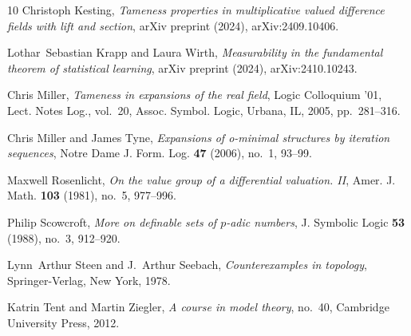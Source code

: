 \documentclass[11pt]{amsart}
\theoremstyle{plain}
\theoremstyle{definition}
\numberwithin{equation}{section}
\newcommand\0{\varnothing}
\begin{document}
\begin{thebibliography}{10}
Christoph Kesting, \emph{Tameness properties in multiplicative valued
  difference fields with lift and section}, arXiv preprint (2024),
  arXiv:2409.10406.

Lothar~Sebastian Krapp and Laura Wirth, \emph{Measurability in the fundamental
  theorem of statistical learning}, arXiv preprint (2024), arXiv:2410.10243.

Chris Miller, \emph{Tameness in expansions of the real field}, Logic
  {C}olloquium '01, Lect. Notes Log., vol.~20, Assoc. Symbol. Logic, Urbana,
  IL, 2005, pp.~281--316.

Chris Miller and James Tyne, \emph{Expansions of o-minimal structures by
  iteration sequences}, Notre Dame J. Form. Log. \textbf{47} (2006), no.~1,
  93--99.

Maxwell Rosenlicht, \emph{On the value group of a differential valuation.
  {II}}, Amer. J. Math. \textbf{103} (1981), no.~5, 977--996.

Philip Scowcroft, \emph{More on definable sets of {$p$}-adic numbers}, J.
  Symbolic Logic \textbf{53} (1988), no.~3, 912--920.

Lynn~Arthur Steen and J.~Arthur Seebach, \emph{Counterexamples in topology},
  Springer-Verlag, New York, 1978.

Katrin Tent and Martin Ziegler, \emph{A course in model theory}, no.~40,
  Cambridge University Press, 2012.

\end{thebibliography}
\end{document}
